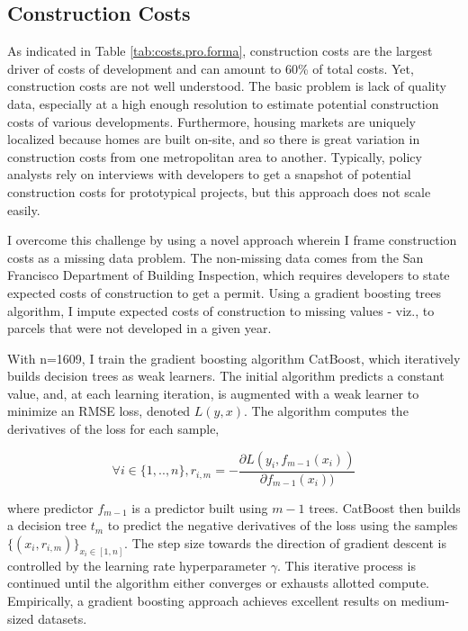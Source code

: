 \documentclass[a4paper,12pt]{article}
\begin{document}
\subsection{Construction Costs}

As indicated in Table \ref{tab:costs.pro.forma}, construction costs are the largest driver of costs of development and can amount to 60\% of total costs. Yet, construction costs are not well understood.\cite{gyourko2006construction} The basic problem is lack of quality data, especially at a high enough resolution to estimate potential construction costs of various developments. Furthermore, housing markets are uniquely localized because homes are built on-site, and so there is great variation in construction costs from one metropolitan area to another.\cite{gyourko2006construction} Typically, policy analysts rely on interviews with developers to get a snapshot of potential construction costs for prototypical projects,\cite{garcia2019making}\cite{la} but this approach does not scale easily.

I overcome this challenge by using a novel approach wherein I frame construction costs as a missing data problem. The non-missing data comes from the San Francisco Department of Building Inspection, which requires developers to state expected costs of construction to get a permit. Using a gradient boosting trees algorithm, I impute expected costs of construction to missing values - viz., to parcels that were not developed in a given year.

With n=1609, I train the gradient boosting algorithm CatBoost, which iteratively builds decision trees as weak learners. The initial algorithm predicts a constant value, and, at each learning iteration, is augmented with a weak learner to minimize an RMSE loss, denoted $L(y,x)$. The algorithm computes the derivatives of the loss for each sample, 

\begin{equation}\label{eq:catboostDerivatives}
\forall i \in \{1,..,n\},   r_{i,m}= -\frac{\partial L(y_{i},f_{m-1}(x_{i}))}{\partial f_{m-1}(x_{i}))}
\end{equation}

where predictor $f_{m-1}$ is a predictor built using $m - 1$ trees. CatBoost then builds a decision tree $t_{m}$ to predict the negative derivatives of the loss using the samples $\{(x_{i},r_{i,m})\}_{x_{i} \in [1,n]}$. The step size towards the direction of gradient descent is controlled by the learning rate hyperparameter $\gamma$. This iterative process is continued until the algorithm either converges or exhausts allotted compute.\cite{prokhorenkova2018catboost} Empirically, a gradient boosting approach achieves excellent results on medium-sized datasets.\cite{bentejac2021comparative}
\end{document}

